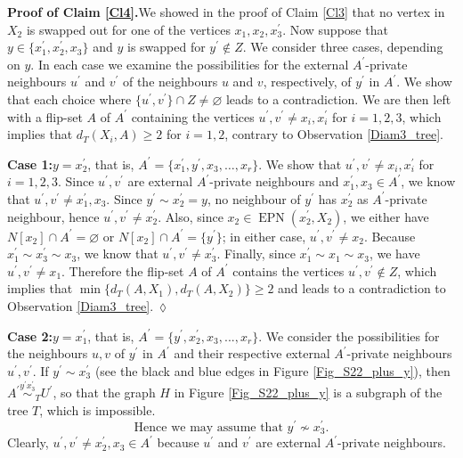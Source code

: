\documentclass[12pt]{article}%
\begin{document}
\noindent\textbf{Proof of Claim \ref{Cl4}.\hspace{0.1in}}We showed in the
proof of Claim \ref{Cl3} that no vertex in $X_{2}$ is swapped out for one of
the vertices $x_{1},x_{2},x_{3}^{\prime}$. Now suppose that $y\in
\{x_{1}^{\prime},x_{2}^{\prime},x_{3}\}$ and $y$ is swapped for $y^{\prime
}\notin Z$. We consider three cases, depending on $y$. In each case we examine
the possibilities for the external $A^{\prime}$-private neighbours $u^{\prime
}$ and $v^{\prime}$ of the neighbours $u$ and $v$, respectively, of
$y^{\prime}$ in $A^{\prime}$. We show that each choice where $\{u^{\prime
},v^{\prime}\}\cap Z\neq\varnothing$ leads to a contradiction. We are then
left with a flip-set $A$ of $A^{\prime}$ containing the vertices $u^{\prime
},v^{\prime}\neq x_{i},x_{i}^{\prime}$ for $i=1,2,3$, which implies that
$d_{T}(X_{i},A)\geq2$ for $i=1,2$, contrary to Observation \ref{Diam3_tree}.
\smallskip

\noindent\textbf{Case 1:\hspace{0.1in}}$y=x_{2}^{\prime}$, that is,
$A^{\prime}=\{x_{1}^{\prime},y^{\prime},x_{3},\dots,x_{r}\}$. We show that
$u^{\prime},v^{\prime}\neq x_{i},x_{i}^{\prime}$ for $i=1,2,3$. Since
$u^{\prime},v^{\prime}$ are external $A^{\prime}$-private neighbours and
$x_{1}^{\prime},x_{3}\in A^{\prime}$, we know that $u^{\prime},v^{\prime}\neq
x_{1}^{\prime},x_{3}$. Since $y^{\prime}\sim x_{2}^{\prime}=y$, no neighbour
of $y^{\prime}$ has $x_{2}^{\prime}$ as $A^{\prime}$-private neighbour, hence
$u^{\prime},v^{\prime}\neq x_{2}^{\prime}$. Also, since $x_{2}\in
\operatorname{EPN}(x_{2}^{\prime},X_{2})$, we either have $N[x_{2}]\cap
A^{\prime}=\varnothing$ or $N[x_{2}]\cap A^{\prime}=\{y^{\prime}\}$; in either
case, $u^{\prime},v^{\prime}\neq x_{2}$. Because $x_{1}^{\prime}\sim
x_{3}^{\prime}\sim x_{3}$, we know that $u^{\prime},v^{\prime}\neq
x_{3}^{\prime}$. Finally, since $x_{1}^{\prime}\sim x_{1}\sim x_{3}$, we have
$u^{\prime},v^{\prime}\neq x_{1}$. Therefore the flip-set $A$ of $A^{\prime}$
contains the vertices $u^{\prime},v^{\prime}\notin Z$, which implies that
$\min\{d_{T}(A,X_{1}),d_{T}(A,X_{2})\}\geq2$ and leads to a contradiction to
Observation \ref{Diam3_tree}.$~\lozenge$\smallskip

\noindent\textbf{Case 2:\hspace{0.1in}}$y=x_{1}^{\prime}$, that is,
$A^{\prime}=\{y^{\prime},x_{2}^{\prime},x_{3},...,x_{r}\}$. We consider the
possibilities for the neighbours $u,v$ of $y^{\prime}$ in $A^{\prime}$ and
their respective external $A^{\prime}$-private neighbours $u^{\prime
},v^{\prime}$. If $y^{\prime}\sim x_{3}^{\prime}$ (see the black and blue
edges in Figure \ref{Fig_S22_plus_y}), then $A^{\prime}\overset{y^{\prime
}x_{3}^{\prime}}{\sim}_{T}U^{\prime}$, so that the graph $H$ in Figure
\ref{Fig_S22_plus_y} is a subgraph of the tree $T$, which is impossible.%
\begin{equation}
\text{Hence\ we\ may\ assume\ that\ }y^{\prime}\nsim x_{3}^{\prime}.
\label{eq_y'x'3}%
\end{equation}
Clearly, $u^{\prime},v^{\prime}\neq x_{2}^{\prime},x_{3}\in A^{\prime}$
because $u^{\prime}$ and $v^{\prime}$ are external $A^{\prime}$-private neighbours.
\end{document}
